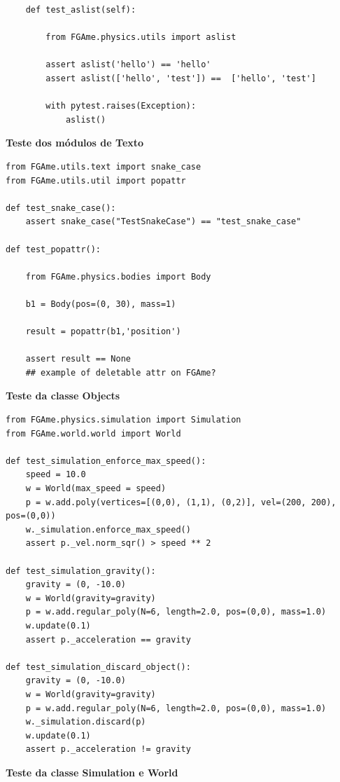 \begin{anexosenv}
\begin{lstlisting}
    def test_aslist(self):

        from FGAme.physics.utils import aslist

        assert aslist('hello') == 'hello'
        assert aslist(['hello', 'test']) ==  ['hello', 'test']

        with pytest.raises(Exception):
            aslist()
\end{lstlisting}



{\LARGE \textbf{Teste dos módulos de Texto}}

\begin{lstlisting}
from FGAme.utils.text import snake_case
from FGAme.utils.util import popattr

def test_snake_case():
    assert snake_case("TestSnakeCase") == "test_snake_case"

def test_popattr():

	from FGAme.physics.bodies import Body

	b1 = Body(pos=(0, 30), mass=1)

	result = popattr(b1,'position')

	assert result == None 
	## example of deletable attr on FGAme?

\end{lstlisting}


{\LARGE \textbf{Teste da classe Objects}}

\begin{lstlisting}
from FGAme.physics.simulation import Simulation
from FGAme.world.world import World

def test_simulation_enforce_max_speed():
    speed = 10.0
    w = World(max_speed = speed)
    p = w.add.poly(vertices=[(0,0), (1,1), (0,2)], vel=(200, 200), pos=(0,0))
    w._simulation.enforce_max_speed()
    assert p._vel.norm_sqr() > speed ** 2

def test_simulation_gravity():
    gravity = (0, -10.0)
    w = World(gravity=gravity)
    p = w.add.regular_poly(N=6, length=2.0, pos=(0,0), mass=1.0)
    w.update(0.1)
    assert p._acceleration == gravity

def test_simulation_discard_object():
    gravity = (0, -10.0)
    w = World(gravity=gravity)
    p = w.add.regular_poly(N=6, length=2.0, pos=(0,0), mass=1.0)
    w._simulation.discard(p)
    w.update(0.1)
    assert p._acceleration != gravity
\end{lstlisting}


{\LARGE \textbf{Teste da classe Simulation e World}}


\end{anexosenv}
